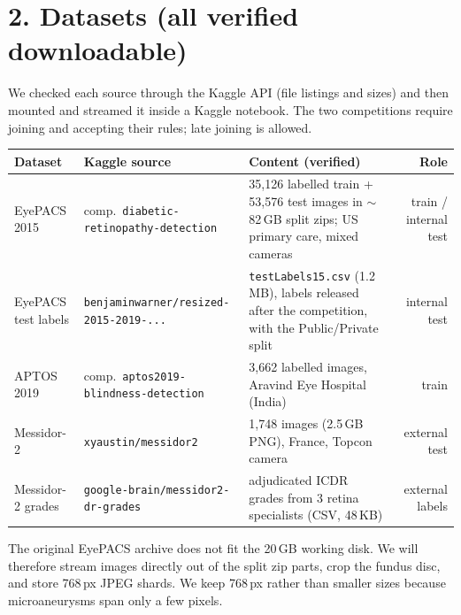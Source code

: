 \documentclass[10pt]{article}
\begin{document}
\section*{2. Datasets (all verified downloadable)}
We checked each source through the Kaggle API (file listings and sizes) and then mounted and streamed it inside a Kaggle notebook.
The two competitions require joining and accepting their rules; late joining is allowed.
\begin{center}\footnotesize
\begin{tabularx}{\linewidth}{@{}l l X r@{}}
\toprule
Dataset & Kaggle source & Content (verified) & Role\\
\midrule
EyePACS 2015~\cite{eyepacs} & comp.\ \texttt{diabetic-retinopathy-detection} & 35,126 labelled train + 53,576 test images in $\sim$82\,GB split zips; US primary care, mixed cameras & train / internal test\\
EyePACS test labels & \texttt{benjaminwarner/resized-2015-2019-...} & \texttt{testLabels15.csv} (1.2\,MB), labels released after the competition, with the Public/Private split & internal test\\
APTOS 2019 & comp.\ \texttt{aptos2019-blindness-detection} & 3,662 labelled images, Aravind Eye Hospital (India) & train\\
Messidor-2~\cite{messidor} & \texttt{xyaustin/messidor2} & 1,748 images (2.5\,GB PNG), France, Topcon camera & external test\\
Messidor-2 grades~\cite{krause} & \texttt{google-brain/messidor2-dr-grades} & adjudicated ICDR grades from 3 retina specialists (CSV, 48\,KB) & external labels\\
\bottomrule
\end{tabularx}
\end{center}
The original EyePACS archive does not fit the 20\,GB working disk. We will therefore stream images directly out of the split zip parts, crop the fundus disc, and store 768\,px JPEG shards.
We keep 768\,px rather than smaller sizes because microaneurysms span only a few pixels.
\end{document}
